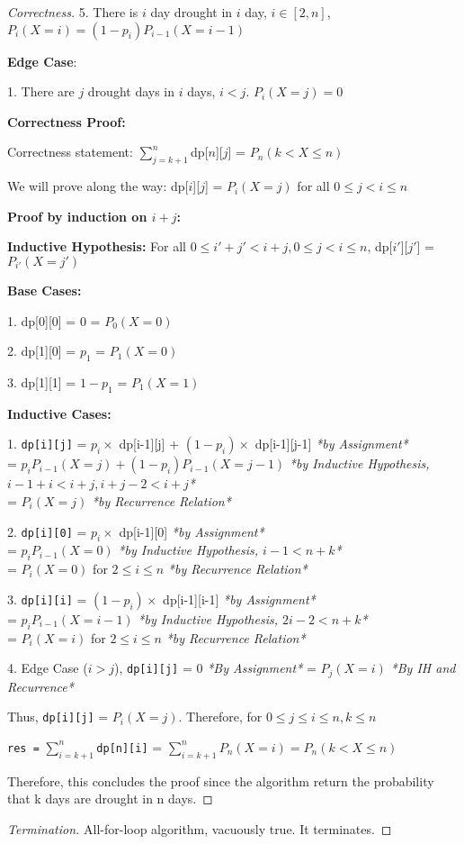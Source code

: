 \documentclass[openany]{article}
\begin{document}
\begin{proof}[Correctness]{}
5. There is $i$ day drought in $i$ day, $i\in[2,n]$,
$P_i(X=i)=(1-p_i)P_{i-1}(X=i-1)$
    
\textbf{Edge Case}:

1. There are $j$ drought days in $i$ days, $i<j$. $P_i(X=j) = 0$

\textbf{Correctness Proof:}

Correctness statement: $\sum_{j=k+1}^{n}$dp[$n$][$j$] = $P_n(k<X\leq n)$
  
We will prove along the way: dp[$i$][$j$] = $P_i(X=j)$ for all $ 0 \leq j < i \leq n$

\textbf{Proof by induction on $i+j$:}

\textbf{Inductive Hypothesis:} For all $0 \leq i'+j'<i+j,0 \leq j < i \leq n$, dp[$i'$][$j'$] = $P_{i'}(X=j')$

\textbf{Base Cases:}

1. dp[0][0] = 0 = $P_0(X=0)$

2. dp[1][0] = $p_1$ = $P_1(X=0)$

3. dp[1][1] = $1-p_1$ = $P_1(X=1)$

\textbf{Inductive Cases:}

1. \texttt{dp[i][j]} = $p_i \times$ dp[i-1][j] + $(1-p_i) \times$ dp[i-1][j-1] \textit{*by Assignment*} \\= $p_i P_{i-1}(X=j) + (1-p_i)P_{i-1}(X=j-1)$ \textit{*by Inductive Hypothesis, $i-1+i < i+j, i+j-2 < i+j$*}
\\= $P_i(X=j)$ \textit{*by Recurrence Relation*}

2. \texttt{dp[i][0]} = $p_i \times$ dp[i-1][0] \textit{*by Assignment*}\\=  $p_i P_{i-1}(X=0)$ \textit{*by Inductive Hypothesis, $i-1 < n+k$*}\\= $P_i(X=0)$ for $2\leq i \leq n$ \textit{*by Recurrence Relation*}

3. \texttt{dp[i][i]} = $(1-p_i) \times$ dp[i-1][i-1] \textit{*by Assignment*} \\= $p_i P_{i-1}(X=i-1)$ \textit{*by Inductive Hypothesis, $2i-2 < n+k$*} \\=   $P_i(X=i)$ for $2\leq i \leq n$ \textit{*by Recurrence Relation*}

4. Edge Case ($i>j$), \texttt{dp[i][j]} = 0 \textit{*By Assignment*} = $P_j(X=i)$ \textit{*By IH and Recurrence*}

Thus, \texttt{dp[i][j]} = $P_i(X=j)$. Therefore, for $0 \leq j \leq i \leq n, k \leq n$ 
\begin{center}
    \texttt{res =} $\sum_{i=k+1}^{n}$\texttt{dp[n][i]} = $\sum_{i=k+1}^{n}P_n(X=i) = P_n(k<X\leq n)$
\end{center}

Therefore, this concludes the proof since the algorithm return the probability that k days are drought in n days.

\end{proof}
\begin{proof}[Termination]{}
    All-for-loop algorithm, vacuously true. It terminates.
\end{proof}
\end{document}

